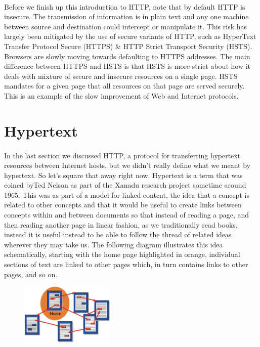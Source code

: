 \documentclass[12pt, a4paper, oneside]{book}
\begin{document}
\paragraph{} Before we finish up this introduction to HTTP, note that by default HTTP is insecure. The transmission of information is in plain text and any one machine between source and destination could intercept or manipulate it. This risk has largely been mitigated by the use of secure variants of HTTP, such as HyperText Transfer Protocol Secure (HTTPS) \& HTTP Strict Transport Security (HSTS). Browsers are slowly moving towards defaulting to HTTPS addresses. The main difference between HTTPS and HSTS is that HSTS is more strict about how it deals with mixture of secure and insecure resources on a single page. HSTS mandates for a given page that all resources on that page are served securely. This is an example of the slow improvement of Web and Internet protocols.


\section{Hypertext}
\paragraph{} In the last section we discussed HTTP, a protocol for transferring hypertext resources between Internet hosts, but we didn't really define what we meant by hypertext. So let's square that away right now. Hypertext is a term that was coined byTed Nelson as part of the Xanadu research project sometime around 1965. This was as part of a model for linked content, the idea that a concept is related to other concepts and that it would be useful to create links between concepts within and between documents so that instead of reading a page, and then reading another page in linear fashion, as we traditionally read books, instead it is useful instead to be able to follow the thread of related ideas wherever they may take us. The following diagram illustrates this idea schematically, starting with the home page highlighted in orange, individual sections of text are linked to other pages which, in turn contains links to other pages, and so on.

\begin{figure}[H]
\centering
\includegraphics[width=0.4\textwidth]{figures/hypertext.png}
\label{fig:hypertext}
\end{figure}
\end{document}
